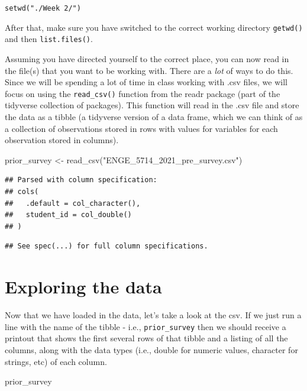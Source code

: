 \documentclass[
]{book}
\newenvironment{Shaded}{\begin{snugshade}}{\end{snugshade}}
\newcommand{\FunctionTok}[1]{\textcolor[rgb]{0.00,0.00,0.00}{#1}}
\newcommand{\NormalTok}[1]{#1}
\newcommand{\OtherTok}[1]{\textcolor[rgb]{0.56,0.35,0.01}{#1}}
\newcommand{\StringTok}[1]{\textcolor[rgb]{0.31,0.60,0.02}{#1}}
\begin{document}
\texttt{setwd("./Week\ 2/")}

After that, make sure you have switched to the correct working directory
\texttt{getwd()} and then \texttt{list.files()}.

Assuming you have directed yourself to the correct place, you can now read in the file(s) that you want to be working with. There are a \emph{lot} of ways to do this. Since we will be spending a lot of time in class working with .csv files, we will focus on using the \texttt{read\_csv()} function from the readr package (part of the tidyverse collection of packages). This function will read in the .csv file and store the data as a tibble (a tidyverse version of a data frame, which we can think of as a collection of observations stored in rows with values for variables for each observation stored in columns).

\begin{Shaded}
\begin{Highlighting}[]
\NormalTok{prior\_survey }\OtherTok{\textless{}{-}} \FunctionTok{read\_csv}\NormalTok{(}\StringTok{"ENGE\_5714\_2021\_pre\_survey.csv"}\NormalTok{)}
\end{Highlighting}
\end{Shaded}

\begin{verbatim}
## Parsed with column specification:
## cols(
##   .default = col_character(),
##   student_id = col_double()
## )
\end{verbatim}

\begin{verbatim}
## See spec(...) for full column specifications.
\end{verbatim}

\hypertarget{exploring-the-data}{%
\section{Exploring the data}\label{exploring-the-data}}

Now that we have loaded in the data, let's take a look at the csv. If we just run a line with the name of the tibble - i.e., \texttt{prior\_survey} then we should receive a printout that shows the first several rows of that tibble and a listing of all the columns, along with the data types (i.e., double for numeric values, character for strings, etc) of each column.

\begin{Shaded}
\begin{Highlighting}[]
\NormalTok{prior\_survey}
\end{Highlighting}
\end{Shaded}
\end{document}
